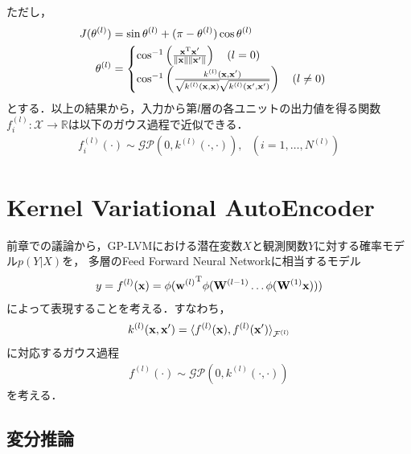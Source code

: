 \documentclass[11pt,a4j]{article}
\begin{document}
        ただし，
        \begin{align}
          J(\theta^{(l)}) &= \sin \theta^{(l)} + (\pi - \theta^{(l)}) \cos \theta^{(l)} \\
          \theta^{(l)} &=
          \begin{cases}
            \cos^{-1} \left( \frac{{\bf x}^{\mathrm{T}} {\bf x}'}{ \|{\bf x}\| \|{\bf x}'\| } \right) ~~~ (l = 0) \\
            \cos^{-1} \left( \frac{k^{(l)}( {\bf x}, {\bf x}' )}{ \sqrt{ k^{(l)}({\bf x}, {\bf x}) } \sqrt{ k^{(l)}({\bf x}', {\bf x}') } } \right) ~~~ (l \neq 0) 
          \end{cases}
        \end{align}
        とする．以上の結果から，入力から第$l$層の各ユニットの出力値を得る関数$f^{(l)}_i: \mathcal{X} \to \mathbb{R}$は以下のガウス過程で近似できる．
        \begin{align}
          f^{(l)}_i(\cdot) \sim \mathcal{GP}( 0, k^{(l)}(\cdot,\cdot) ), ~~~ (i=1,\dots,N^{(l)})
        \end{align}

  \section{Kernel Variational AutoEncoder}
    前章での議論から，GP-LVMにおける潜在変数$X$と観測関数$Y$に対する確率モデル$p(Y|X)$を，
    多層のFeed Forward Neural Networkに相当するモデル
    \begin{align}
      y = f^{(l)} ({\bf x}) = \phi( {{\bf w}^{(l)}}^{\mathrm{T}} \phi( {\bf W}^{(l-1)}  \dots \phi( {\bf W}^{(1)} {\bf x}) ) )
    \end{align}
    によって表現することを考える．すなわち，
    \begin{align}
      k^{(l)}( {\bf x}, {\bf x}' ) = { \langle f^{(l)} ({\bf x}), f^{(l)} ({\bf x}') \rangle }_{\mathcal{F}^{(l)}}
    \end{align}
    に対応するガウス過程
    \begin{align}
      f^{(l)}(\cdot) \sim \mathcal{GP}(0, k^{(l)}(\cdot,\cdot))
    \end{align}
    を考える．

    \subsection{変分推論}


    \newpage
\end{document}
